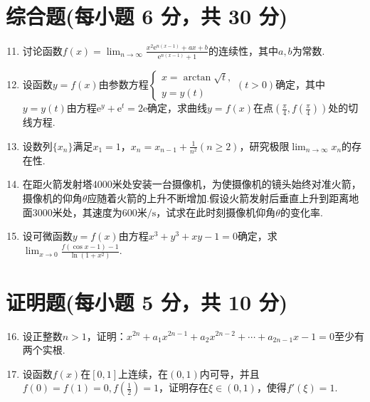 \documentclass[../Main.tex]{subfiles}
\begin{document}
\section{综合题(每小题 6 分，共 30 分)}
\begin{enumerate}
    \setcounter{enumi}{10}
    \item 讨论函数$f(x)=\lim_{n\to\infty}\frac{x^{2}\mathrm{e}^{n(x-1)}+ax+b}{\mathrm{e}^{n(x-1)}+1}$的连续性，其中$a
              ,b$为常数.
          \vspace{13em}

    \item 设函数$y=f(x)$由参数方程$\begin{cases}
                  x=\arctan\sqrt{t}, \\
                  y=y(t)
              \end{cases}(t>0)$确定，其中$y=y(t)$由方程$\mathrm{e}^{y}+\mathrm{e}^{t}=2\mathrm{e}$确定，求曲线$y
              =f(x)$在点$\left(\frac{\pi}{4},f\left(\frac{\pi}{4}\right)\right)$处的切线方程.
          \vspace{13em}

    \item 设数列$\{x_{n}\}$满足$x_{1}=1$，$x_{n}=x_{n-1}+\frac{1}{n^{2}}(n\geq
              2)$，研究极限$\lim_{n\to\infty}x_{n}$的存在性.
          \vspace{8em}

    \item 在距火箭发射塔4000米处安装一台摄像机，为使摄像机的镜头始终对准火箭，摄像机的仰角$\theta$应随着火箭的上升不断增加.假设火箭发射后垂直上升到距离地面3000米处，其速度为$6
              00$米$/\mathrm{s}$，试求在此时刻摄像机仰角$\theta$的变化率.
          \vspace{8em}

    \item 设可微函数$y=f(x)$由方程$x^{3}+y^{3}+xy-1=0$确定，求$\lim_{x\to0}\frac{f(\cos
                  x-1)-1}{\ln(1+x^{2})}$.
          \vspace{8em}
\end{enumerate}

\section{证明题(每小题 5 分，共 10 分)}
\begin{enumerate}
    \setcounter{enumi}{15}
    \item 设正整数$n>1$，证明：$x^{2n}+a_{1}x^{2n-1}+a_{2}x^{2n-2}+\cdots+a_{2n-1}
              x-1=0$至少有两个实根.
          \vspace{10em}

    \item 设函数$f(x)$在$[0,1]$上连续，在$(0,1)$内可导，并且$f(0)=f(1)=0,f\left
              (\frac{1}{2}\right)=1$，证明存在$\xi\in(0,1)$，使得$f'(\xi)=1$.
          \vspace{8em}
\end{enumerate}
\end{document}

